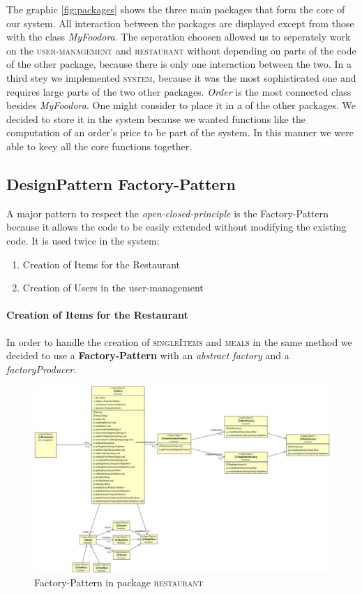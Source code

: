 The graphic \ref{fig:packages} shows the three main packages that form the core of our system. All
interaction between the packages are displayed except from those with the class \textit{MyFoodora}.
The seperation choosen allowed us to seperately work on the \textsc{user-management} and
\textsc{restaurant} without depending on parts of the code of the other package, because there is 
only one interaction between the two. In a third stey we implemented \textsc{system}, because it was
the most sophisticated one and requires large parts of the two other packages. \textit{Order}
is the most connected class besides \textit{MyFoodora}. One might consider to place it in a of the other 
packages. We decided to store it in the system because we wanted functions like the computation of 
an order's price to be part of the system. In this manner we were able to keey all the core functions
together. 

\subsection{DesignPattern Factory-Pattern}
\label{sub:designpattern_factory_pattern}

A major pattern to respect the \textit{open-closed-principle} is the Factory-Pattern because it
allows the code to be easily extended without modifying the existing code. It is used twice in the
system:
\begin{enumerate}
	\item Creation of Items for the Restaurant
	\item Creation of Users in the user-management
\end{enumerate}

\paragraph{Creation of Items for the Restaurant}

In order to handle the creation of \textsc{singleItems} and \textsc{meals} in the same method we 
decided to use a \textbf{Factory-Pattern} with an \textit{abstract factory} and a
\textit{factoryProducer}. 

\begin{figure}[H]
	\centering
	\includegraphics[width=1\linewidth]{./ima/restaurant_factory_pattern.jpg}
	\caption{Factory-Pattern in package \textsc{restaurant}}
	\label{fig:restaurant-factory-pattern}
\end{figure}

